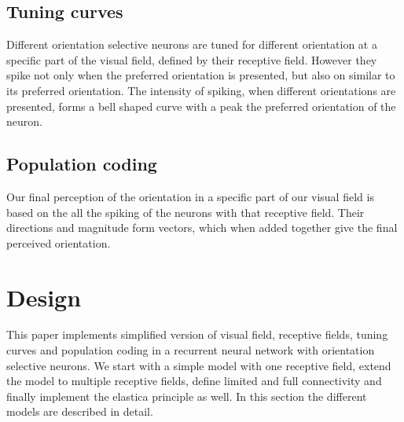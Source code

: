 \section{Tuning curves}

Different orientation selective neurons are tuned for different orientation at a specific part of the visual field, defined by their receptive field. However they spike not only when the preferred orientation is presented, but also on similar to its preferred orientation. The intensity of spiking, when different orientations are presented, forms a bell shaped curve with a peak the preferred orientation of the neuron. 



\section{Population coding}

Our final perception of the orientation in a specific part of our visual field is based on the all the spiking of the neurons with that receptive field. Their directions and magnitude form vectors, which when added together give the final perceived orientation.


\chapter{Design}

This paper implements simplified version of visual field, receptive fields, tuning curves and population coding in a recurrent neural network with orientation selective neurons. We start with a simple model with one receptive field, extend the model to multiple receptive fields, define limited and full connectivity and finally implement the elastica principle as well. In this section the different models are described in detail.

